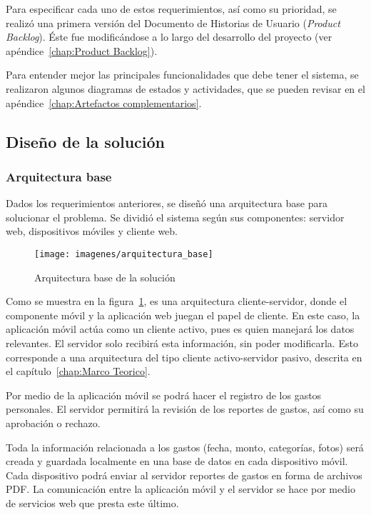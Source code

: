 Para especificar cada uno de estos requerimientos, así como su prioridad, se realizó una primera versión del Documento de Historias de Usuario (\textit{Product Backlog}). Éste fue modificándose a lo largo del desarrollo del proyecto (ver apéndice~\ref{chap:Product Backlog}).

Para entender mejor las principales funcionalidades que debe tener el sistema, se realizaron algunos diagramas de estados y actividades, que se pueden revisar en el apéndice~\ref{chap:Artefactos complementarios}.

\subsection{Diseño de la solución}

\subsubsection{Arquitectura base} \label{section:Arquitectura base}

Dados los requerimientos anteriores, se diseñó una arquitectura base para solucionar el problema. Se dividió el sistema según sus componentes: servidor web, dispositivos móviles y cliente web. 

\begin{figure}[ht]
  \centering
  \texttt{[image: imagenes/arquitectura\_base]}
  \caption{Arquitectura base de la solución}
  \label{fig:arquitecturaBase}
\end{figure}

Como se muestra en la figura~\ref{fig:arquitecturaBase}, es una arquitectura cliente-servidor, donde el componente móvil y la aplicación web juegan el papel de cliente. En este caso, la aplicación móvil actúa como un cliente activo, pues es quien manejará los datos relevantes. El servidor solo recibirá esta información, sin poder modificarla. Esto corresponde a una arquitectura del tipo cliente activo-servidor pasivo, descrita en el capítulo~\ref{chap:Marco Teorico}.

Por medio de la aplicación móvil se podrá hacer el registro de los gastos personales. El servidor permitirá la revisión de los reportes de gastos, así como su aprobación o rechazo.

Toda la información relacionada a los gastos (fecha, monto, categorías, fotos) será creada y guardada localmente en una base de datos en cada dispositivo móvil. Cada dispositivo podrá enviar al servidor reportes de gastos en forma de archivos PDF. La comunicación entre la aplicación móvil y el servidor se hace por medio de servicios web que presta este último.

